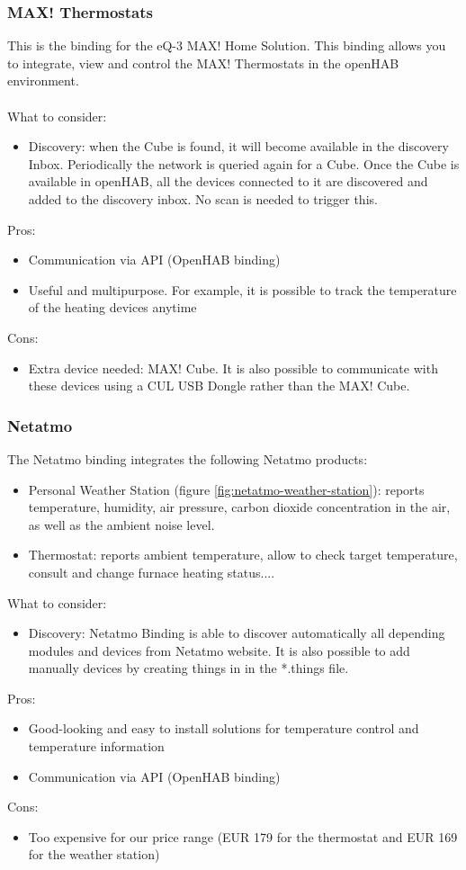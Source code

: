 \subsubsection{MAX! Thermostats}
This is the binding for the eQ-3 MAX! Home Solution. This binding allows you to integrate, view and control the MAX! Thermostats
in the openHAB environment.\\~\\
What to consider:
\begin{itemize}
	\item Discovery: when the Cube is found, it will become available in the discovery Inbox. Periodically the network is queried again
	for a Cube. Once the Cube is available in openHAB, all the devices connected to it are discovered and added to the discovery inbox.
	No scan is needed to trigger this.
\end{itemize}
Pros:
\begin{itemize}
	\item Communication via API (OpenHAB binding)
	\item Useful and multipurpose. For example, it is possible to track the temperature of the heating devices anytime
\end{itemize}
Cons:
\begin{itemize}
	\item Extra device needed: MAX! Cube. It is also possible to communicate with these devices using a CUL USB Dongle rather than
	the MAX! Cube.
\end{itemize}

\subsubsection{Netatmo}
The Netatmo binding integrates the following Netatmo products:
\begin{itemize}
	\item Personal Weather Station (figure \ref{fig:netatmo-weather-station}): reports temperature, humidity, air pressure, carbon
	dioxide concentration in the air, as well as the ambient noise level.
	\item Thermostat: reports ambient temperature, allow to check target temperature, consult and change furnace heating status....
\end{itemize}
What to consider:
\begin{itemize}
	\item Discovery: Netatmo Binding is able to discover automatically all depending modules and devices from Netatmo website. It is
	also possible to add manually devices by creating things in in the *.things file.
\end{itemize}
Pros:
\begin{itemize}
	\item Good-looking and easy to install solutions for temperature control and temperature information
	\item Communication via API (OpenHAB binding)
\end{itemize}
Cons:
\begin{itemize}
	\item Too expensive for our price range (EUR 179 for the thermostat and EUR 169 for the weather station)
\end{itemize}


